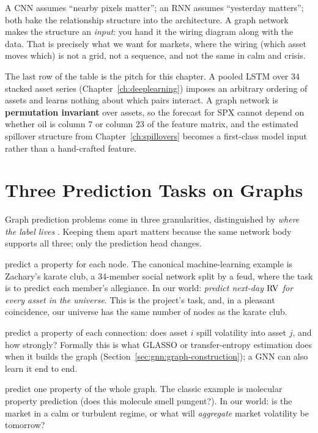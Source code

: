 \begin{intuition}
A CNN assumes ``nearby pixels matter''; an RNN assumes ``yesterday matters''; both bake the relationship structure into the architecture. A graph network makes the structure an \emph{input}: you hand it the wiring diagram along with the data. That is precisely what we want for markets, where the wiring (which asset moves which) is not a grid, not a sequence, and not the same in calm and crisis.
\end{intuition}

\begin{projectconnection}
The last row of the table is the pitch for this chapter. A pooled LSTM over 34 stacked asset series (Chapter~\ref{ch:deeplearning}) imposes an arbitrary ordering of assets and learns nothing about which pairs interact. A graph network is \textbf{permutation invariant} over assets, so the forecast for SPX cannot depend on whether oil is column 7 or column 23 of the feature matrix, and the estimated spillover structure from Chapter~\ref{ch:spillovers} becomes a first-class model input rather than a hand-crafted feature.
\end{projectconnection}

\section{Three Prediction Tasks on Graphs}\label{sec:gnn:tasks}

Graph prediction problems come in three granularities, distinguished by \emph{where the label lives} \citep{SanchezLengeling2021}. Keeping them apart matters because the same network body supports all three; only the prediction head changes.

\begin{description}[nosep]
  \item[Node-level tasks] predict a property for each node. The canonical machine-learning example is Zachary's karate club, a 34-member social network split by a feud, where the task is to predict each member's allegiance. In our world: \emph{predict next-day $\operatorname{RV}$ for every asset in the universe}. This is the project's task, and, in a pleasant coincidence, our universe has the same number of nodes as the karate club.
  \item[Edge-level tasks] predict a property of each connection: does asset $i$ spill volatility into asset $j$, and how strongly? Formally this is what GLASSO or transfer-entropy estimation does when it builds the graph (Section~\ref{sec:gnn:graph-construction}); a GNN can also learn it end to end.
  \item[Graph-level tasks] predict one property of the whole graph. The classic example is molecular property prediction (does this molecule smell pungent?). In our world: is the market in a calm or turbulent regime, or what will \emph{aggregate} market volatility be tomorrow?
\end{description}

